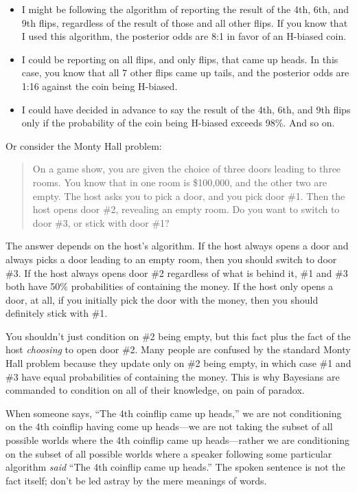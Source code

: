 \begin{itemize}
\item {
 I might be following the algorithm of reporting the result of the
4th, 6th, and 9th flips, regardless of the result of those and all
other flips. If you know that I used this algorithm, the posterior odds
are 8:1 in favor of an H-biased coin.}

\item {
 I could be reporting on all flips, and only flips, that came up
heads. In this case, you know that all 7 other flips came up tails, and
the posterior odds are 1:16 against the coin being H-biased.}

\item {
 I could have decided in advance to say the result of the 4th, 6th,
and 9th flips only if the probability of the coin being H-biased
exceeds 98\%. And so on.}
\end{itemize}

{
 Or consider the Monty Hall problem:}

\begin{quote}
{
 On a game show, you are given the choice of three doors leading to
three rooms. You know that in one room is \$100,000, and the other two
are empty. The host asks you to pick a door, and you pick door \#1.
Then the host opens door \#2, revealing an empty room. Do you want to
switch to door \#3, or stick with door \#1?}
\end{quote}

{
 The answer depends on the host's algorithm. If the
host always opens a door and always picks a door leading to an empty
room, then you should switch to door \#3. If the host always opens door
\#2 regardless of what is behind it, \#1 and \#3 both have 50\%
probabilities of containing the money. If the host only opens a door,
at all, if you initially pick the door with the money, then you should
definitely stick with \#1.}

{
 You shouldn't just condition on \#2 being empty,
but this fact plus the fact of the host \textit{choosing} to open door
\#2. Many people are confused by the standard Monty Hall problem
because they update only on \#2 being empty, in which case \#1 and \#3
have equal probabilities of containing the money. This is why Bayesians
are commanded to condition on all of their knowledge, on pain of
paradox.}

{
 When someone says, ``The 4th coinflip came up
heads,'' we are not conditioning on the 4th coinflip
having come up heads---we are not taking the subset of all possible
worlds where the 4th coinflip came up heads---rather we are
conditioning on the subset of all possible worlds where a speaker
following some particular algorithm \textit{said}
``The 4th coinflip came up heads.''
The spoken sentence is not the fact itself; don't be
led astray by the mere meanings of words.}

